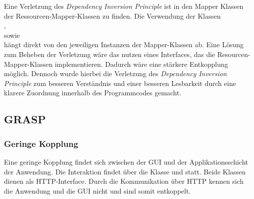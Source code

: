 Eine Verletzung des \textit{Dependency Inversion Principle} ist in den Mapper Klassen der Ressourcen-Mapper-Klassen zu finden. Die Verwendung der Klassen \\\href{https://github.com/lucasmerkel/dhbw-advancedswe-programmentwurf/blob/5764d7da4cfd0562ed8e96128e92f85c30b7309d/swe_programmentwurf/consumergoods-inventory-planner/1-cip-adapters/src/main/java/de/dhbw/cip/adapters/ConsumerGoodsToConsumerGoodsResourceMapper.java}{}, \\\href{https://github.com/lucasmerkel/dhbw-advancedswe-programmentwurf/blob/5764d7da4cfd0562ed8e96128e92f85c30b7309d/swe_programmentwurf/consumergoods-inventory-planner/1-cip-adapters/src/main/java/de/dhbw/cip/adapters/FridgeToFridgeResourceMapper.java}{} sowie \\\href{https://github.com/lucasmerkel/dhbw-advancedswe-programmentwurf/blob/5764d7da4cfd0562ed8e96128e92f85c30b7309d/swe_programmentwurf/consumergoods-inventory-planner/1-cip-adapters/src/main/java/de/dhbw/cip/adapters/FoodShelfToFoodShelfRessourceMapper.java}{} hängt direkt von den jeweiligen Instanzen der Mapper-Klassen ab.
Eine Lösung zum Beheben der Verletzung wäre das nutzen eines Interfaces, das die Resourcen-Mapper-Klassen implementieren.
Dadurch wäre eine stärkere Entkopplung möglich.
Dennoch wurde hierbei die Verletzung des \textit{Dependency Inversion Principle} zum besseren Verständnis und einer besseren Lesbarkeit durch eine klarere Zuordnung innerhalb des Programmcodes gemacht.

\subsection{\ac{GRASP}}

\subsubsection*{Geringe Kopplung}
Eine geringe Kopplung findet sich zwischen der \ac{GUI} und der Applikationsschicht der Anwendung.
Die Interaktion findet über die Klasse \href{https://github.com/lucasmerkel/dhbw-advancedswe-programmentwurf/blob/5764d7da4cfd0562ed8e96128e92f85c30b7309d/swe_programmentwurf/consumergoods-inventory-planner/0-cip-plugins/src/main/java/de/dhbw/cip/plugins/rest/ConsumerGoodsGuiController.java}{} und \href{https://github.com/lucasmerkel/dhbw-advancedswe-programmentwurf/blob/5764d7da4cfd0562ed8e96128e92f85c30b7309d/swe_programmentwurf/consumergoods-inventory-planner/0-cip-plugins/src/main/java/de/dhbw/cip/plugins/rest/StorageGuiController.java}{} statt.
Beide Klassen dienen als \ac{HTTP}-Interface.
Durch die Kommunikation über \ac{HTTP} kennen sich die Anwendung und die \ac{GUI} nicht und sind somit entkoppelt.

